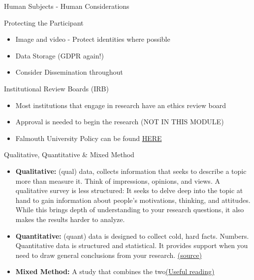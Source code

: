 \documentclass[ignorenonframetext,]{beamer}
\providecommand{\tightlist}{%
  \setlength{\itemsep}{0pt}\setlength{\parskip}{0pt}}
\begin{document}
\begin{frame}{Human Subjects - Human Considerations}
\begin{block}{Protecting the Participant}
\begin{itemize}
  \begin{itemize}
  \tightlist
  \item
    Image and video - Protect identities where possible
  \item
    Data Storage (GDPR again!)
  \item
    Consider Dissemination throughout
  \end{itemize}
\end{itemize}

\end{block}

\begin{block}{Institutional Review Boards (IRB)}

\begin{itemize}
\tightlist
\item
  Most institutions that engage in research have an ethics review board
\item
  Approval is needed to begin the research (NOT IN THIS MODULE)
\item
  Falmouth University Policy can be found
  \href{https://www.falmouth.ac.uk/sites/default/files/download/research_ethics_policy-13nov15.pdf}{HERE}
\end{itemize}

\end{block}

\begin{block}{Qualitative, Quantitative \& Mixed Method}

\begin{itemize}
\tightlist
\item
  \textbf{Qualitative:} (qual) data, collects information that seeks to
  describe a topic more than measure it. Think of impressions, opinions,
  and views. A qualitative survey is less structured: It seeks to delve
  deep into the topic at hand to gain information about people's
  motivations, thinking, and attitudes. While this brings depth of
  understanding to your research questions, it also makes the results
  harder to analyze.
\item
  \textbf{Quantitative:} (quant) data is designed to collect cold, hard
  facts. Numbers. Quantitative data is structured and statistical. It
  provides support when you need to draw general conclusions from your
  research.
  \href{https://www.surveymonkey.com/mp/quantitative-vs-qualitative-research/}{(source)}
\item
  \textbf{Mixed Method:} A study that combines the
  two\href{http://didier-jourdan.com/wp-content/uploads/2017/04/MM-and-Graduates-students.pdf}{(Useful
  reading)}
\end{itemize}


\end{block}
\end{frame}
\end{document}
